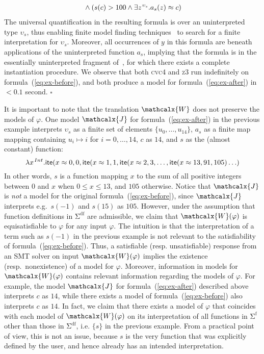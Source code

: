 \documentclass[runningheads,a4paper]{llncs}
\newcommand{\con}[1]{\mathsf{#1}}
\let\oldSigma=\Sigma
\def\Sigma{\mathrm{\oldSigma}}
\newcommand{\cvc}{\textsc{cvc}{\small 4}\xspace}
\newcommand{\ziii}{\textsc{z}{\small 3}\xspace}
\newcommand{\teq}{\approx}
\newcommand{\I}{\mathcalx{J}} %
\newcommand{\conv}{\mathcalx{W}}
\newcommand{\sfuns}[1]{#1^\mathrm{f}}
\newcommand{\sfundefs}[1]{#1^\mathrm{df}}
\newcommand{\lite}{\con{ite}}
\newcommand{\farg}[1]{a_{#1}}
\newcommand{\fargsort}[1]{\upsilon_{#1}}
\newcommand{\vthinspace}{\kern+0.083333em}
\newcommand{\typ}[1]{^{\vthinspace #1}}
\begin{document}
\begin{example}
\begin{eqnarray}
\begin{split}
\end{split}  
\wedge ( s( c ) > 100 \wedge \exists z\typ{\fargsort{s}}. \farg{s}( z ) \teq c )
\end{eqnarray} 
The universal quantification in the resulting formula is over an uninterpreted type $\fargsort{s}$, 
thus enabling finite model finding techniques~\cite{ReyEtAl-1-RR-13} to search for a finite interpretation for $\fargsort{s}$.
Moreover, all occurrences of $y$ in this formula are beneath applications of the uninterpreted function $\farg{s}$,
implying that the formula is in the essentially uninterpreted fragment of~\cite{GeDeM-CAV-09}, for which there exists a complete instantiation procedure.
We observe that both \cvc and \ziii run indefinitely on formula~(\ref{eq:ex-before}),
and both produce a model for formula~(\ref{eq:ex-after}) in $<0.1$ second.
$\square$
\end{example}

It is important to note that the translation $\conv$ does not preserve the models of $\varphi$.
One model $\I$ for formula~(\ref{eq:ex-after}) in the previous example interprets 
$\fargsort{s}$ as a finite set of elements $\{ u_0, \ldots, u_{14} \}$,
$\farg{s}$ as a finite map mapping containing $u_i \mapsto i$ for $i = 0, \ldots, 14$,
$c$ as $14$, 
and $s$ as the (almost constant) function:
\begin{equation}
\lambda x\typ{Int}. \lite( x \teq 0, 0, \lite( x \teq 1, 1, \lite( x \teq 2, 3, \ldots, \lite( x \teq 13, 91, 105 ) \ldots )
\end{equation}
In other words, $s$ is a function mapping $x$ to the sum of all positive integers between $0$ and $x$ when $0 \leq x \leq 13$,
and $105$ otherwise.
Notice that $\I$ is \emph{not} a model for the original formula~(\ref{eq:ex-before}),
since $\I$ interprets e.g.\ $s( -1 )$ and $s( 15 )$ as $105$.
However, under the assumption that function definitions in $\sfundefs{\Sigma}$ are admissible, 
we claim that $\conv(\varphi)$ is equisatisfiable to $\varphi$ for any input $\varphi$.
The intuition is that the interpretation of a term such as $s( -1 )$ in the previous example is not relevant to the satisfiability of formula~(\ref{eq:ex-before}).
Thus, a satisfiable (resp. unsatisfiable) response from an SMT solver on input $\conv( \varphi )$ implies the existence (resp.\ nonexistence) of a model for $\varphi$.
Moreover, information in models for $\conv( \varphi )$ contains relevant information regarding the models of $\varphi$.
For example, the model $\I$ for formula~(\ref{eq:ex-after}) described above interprets $c$ as $14$, 
while there exists a model of formula~(\ref{eq:ex-before}) also interprets $c$ as $14$.
In fact, we claim that there exists a model of $\varphi$ that coincides with each model of $\conv( \varphi )$ on its interpretation of all functions in $\sfuns{\Sigma}$ 
other than those in $\sfundefs{\Sigma}$, i.e. $\{ s \}$ in the previous example.
From a practical point of view, this is not an issue, because
$s$ is the very function that was explicitly defined by the user,
and hence already has an intended interpretation.
\end{document}
